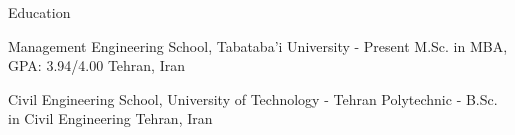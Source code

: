 \documentclass[../professional-cv.tex]{subfiles}
\begin{document}
	\begin{rSection}{ Education }
		
		
		\rSubsectionHeading
		{Management Engineering School, \Allameh Tabataba'i University}
		{  - Present }
		{\normalfont M.Sc. in MBA, GPA: 3.94/4.00}
		{Tehran, Iran}
	
		\rSubsectionHeading
		{Civil Engineering School, \Amirkabir University of Technology - Tehran Polytechnic}
		{  -  }
		{\normalfont B.Sc. in Civil Engineering}
		{Tehran, Iran}
		
		
	\end{rSection}
\end{document}
